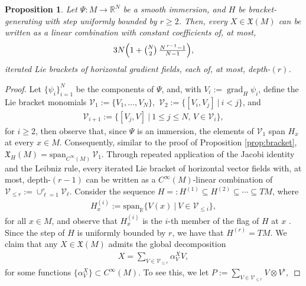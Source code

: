 \documentclass{article}
\newtheorem{proposition}[theorem]{Proposition}
\theoremstyle{remark}
\newcommand{\M}{M}
\newcommand{\Cinf}{C^{\infty}(\M)}
\newcommand{\X}{\mathfrak{X}(\M)}
\newcommand{\XH}{\mathfrak{X}_H(\M)}
\DeclareMathOperator{\grad}{\mathrm{grad}}
\begin{document}
%
\begin{proposition}\label{prop:bracket_full}
    Let $\Psi:\M\rightarrow\mathbb{R}^N$ be a smooth immersion, and $H$ be bracket-generating with step uniformly bounded by $r\geq 2$. Then, every $X\in \X$ can be written as a linear combination with constant coefficients of, at most,
    \begin{align*}
        3N\Big(1+\tbinom{N}{2}\,\tfrac{N^{\,r-1}-1}{N-1}\Big),
    \end{align*}
    iterated Lie brackets of horizontal gradient fields, each of, at most, depth-$(r)$.
\end{proposition}
%

%
\begin{proof}
    Let $\{\psi_i\}_{i=1}^N$ be the components of $\Psi$, and, with $V_i:=\grad_H\psi_i$, define the Lie bracket monomials $\mathcal{V}_1:=\{V_1,\dots,V_N\},$  $\mathcal{V}_2:=\{[V_i,V_j]~|~i<j\}$, and
    \begin{align*}
        \mathcal{V}_{i+1}:=\{[V_j,V]~|~ 1\leq j\leq N, \,V\in\mathcal{V}_{i}\},
    \end{align*}
    for $i\geq 2$, then observe that, since $\Psi$ is an immersion, the elements of $\mathcal{V}_1$ span $H_x$ at every $x\in\M$. Consequently, similar to the proof of Proposition \ref{prop:bracket}, $\XH=\mathrm{span}_{\Cinf}\,\mathcal{V}_1$. Through repeated application of the Jacobi identity and the Leibniz rule, every iterated Lie bracket of horizontal vector fields with, at most, depth-$(r-1)$ can be written as a $\Cinf$-linear combination of $\mathcal{V}_{\leq r}:=\cup_{\ell=1}^r\mathcal{V}_\ell$. Consider the sequence $H=:H^{(1)}\subseteq H^{(2)} \subseteq \cdots \subseteq T\M$, where
    \begin{align*}
        H^{(i)}_x:= \mathrm{span}_{\mathbb{R}}\{V(x)~|~ V\in\mathcal{V}_{\leq i}\},
    \end{align*}
    for all $x\in\M$, and observe that $H_x^{(i)}$ is the $i$-th member of the flag of $H$ at $x$ \cite[Definition 10.1]{AgrachevBarilariBoscain2020}. Since the step of $H$ is uniformly bounded by $r$, we have that $H^{(r)}=T\M$. We claim that any $X\in\X$ admits the global decomposition
    \begin{align}
        X = \sum_{V\in\mathcal{V}_{\leq r}}\alpha^X_V V, \label{eq:pseudo_inverse}
    \end{align}
    for some functions $\{\alpha^X_V\}\subset\Cinf$. To see this, we let
    $P := \sum_{V\in\mathcal{V}_{\leq r}} V\otimes V^\flat,$

\end{proof}
\end{document}
